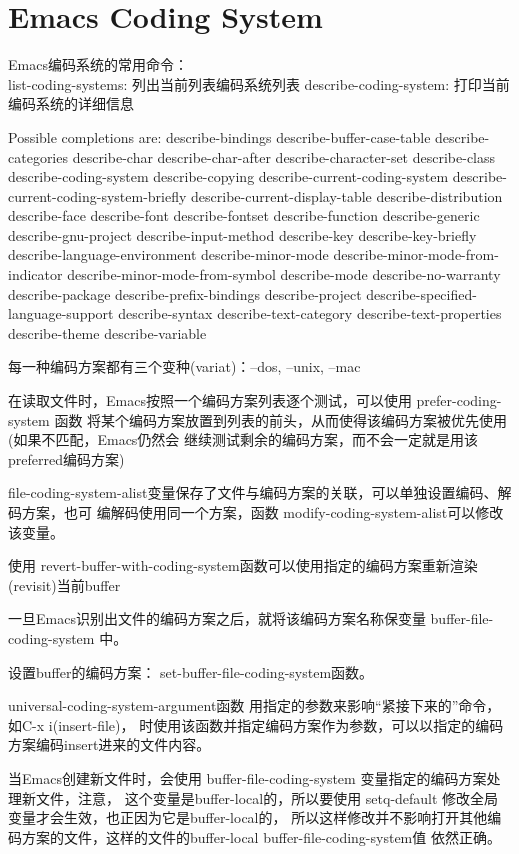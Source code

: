 ﻿\documentclass[a4paper,11pt]{article}
\begin{document}
  \section[Emacs Coding System]{Emacs Coding System}
  Emacs编码系统的常用命令：\\
  list-coding-systems: 列出当前列表编码系统列表
  describe-coding-system: 打印当前编码系统的详细信息

  Possible completions are:
  describe-bindings 	describe-buffer-case-table
  describe-categories 	describe-char
  describe-char-after 	describe-character-set
  describe-class 	describe-coding-system
  describe-copying 	describe-current-coding-system
  describe-current-coding-system-briefly 	describe-current-display-table
  describe-distribution 	describe-face
  describe-font 	describe-fontset
  describe-function 	describe-generic
  describe-gnu-project 	describe-input-method
  describe-key 	describe-key-briefly
  describe-language-environment 	describe-minor-mode
  describe-minor-mode-from-indicator 	describe-minor-mode-from-symbol
  describe-mode 	describe-no-warranty
  describe-package 	describe-prefix-bindings
  describe-project 	describe-specified-language-support
  describe-syntax 	describe-text-category
  describe-text-properties 	describe-theme
  describe-variable

  每一种编码方案都有三个变种(variat)：--dos, --unix, --mac

  在读取文件时，Emacs按照一个编码方案列表逐个测试，可以使用 prefer-coding-system 函数
  将某个编码方案放置到列表的前头，从而使得该编码方案被优先使用(如果不匹配，Emacs仍然会
  继续测试剩余的编码方案，而不会一定就是用该preferred编码方案)

  file-coding-system-alist变量保存了文件与编码方案的关联，可以单独设置编码、解码方案，也可
  编解码使用同一个方案，函数 modify-coding-system-alist可以修改该变量。

  使用 revert-buffer-with-coding-system函数可以使用指定的编码方案重新渲染(revisit)当前buffer

  一旦Emacs识别出文件的编码方案之后，就将该编码方案名称保变量 buffer-file-coding-system 中。

  设置buffer的编码方案： set-buffer-file-coding-system函数。

  universal-coding-system-argument函数 用指定的参数来影响“紧接下来的”命令，如C-x i(insert-file)，
  时使用该函数并指定编码方案作为参数，可以以指定的编码方案编码insert进来的文件内容。

  当Emacs创建新文件时，会使用 buffer-file-coding-system 变量指定的编码方案处理新文件，注意，
  这个变量是buffer-local的，所以要使用 setq-default 修改全局变量才会生效，也正因为它是buffer-local的，
  所以这样修改并不影响打开其他编码方案的文件，这样的文件的buffer-local buffer-file-coding-system值
  依然正确。
\end{document}
